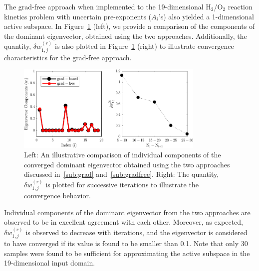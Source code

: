 The grad-free approach when implemented to the 19-dimensional H$_2$/O$_2$ reaction kinetics problem
with uncertain pre-exponents ($A_i$'s) also yielded a 1-dimensional active subspace. In Figure~\ref{fig:comp} (left),
we provide a comparison of the components of the dominant eigenvector, obtained using the two approaches.
Additionally, the quantity, $\delta w_{1,j}^{(r)}$ is also plotted in
Figure~\ref{fig:comp} (right) to illustrate convergence characteristics for the grad-free approach.
%
\begin{figure}[htbp]
 \begin{center}
  \includegraphics[width=0.8\textwidth]{./Figures/eigv6}
\caption{Left: An illustrative comparison of individual components of the converged dominant eigenvector obtained
using the two approaches discussed in~\ref{sub:grad} and~\ref{sub:gradfree}. Right: The quantity,  $\delta w_{1,j}^{(r)}$
is plotted for successive iterations to illustrate the convergence behavior.}
\label{fig:comp}
\end{center}
\end{figure}
%
Individual components of the dominant eigenvector from the two approaches are observed to be in excellent
agreement with each other. Moreover, as expected,  $\delta w_{1,j}^{(r)}$ is observed to decrease with iterations, and
the eigenvector is considered to have converged if its value is found to be smaller than 0.1. Note that only 30 samples
were found to be sufficient for approximating the active subspace in the 19-dimensional input domain. 

